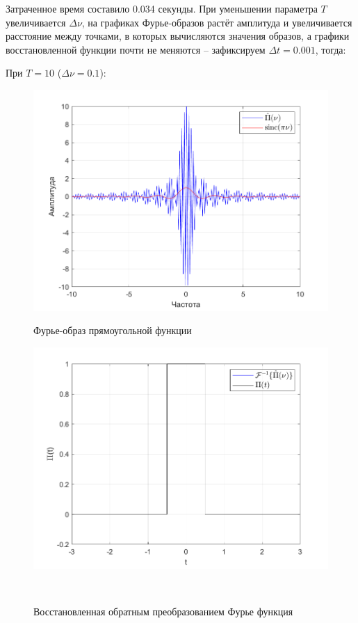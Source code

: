 \documentclass[a4paper]{article}
\begin{document}
Затраченное время составило 0.034 секунды. 
При уменьшении параметра $T$ увеличивается $\Delta \nu$, на графиках Фурье-образов растёт амплитуда и увеличивается расстояние между точками, в которых вычисляются значения образов, а графики восстановленной функции почти не меняются -- зафиксируем $\Delta t = 0.001$, тогда:

При $T = 10$ ($\Delta \nu = 0.1$):

\begin{figure}[H]
    \begin{minipage}{0.5\textwidth}
        \centering \includegraphics[width=\textwidth]{graphs/2/T_10_dt_0.001_V_1000_dv_0.1/fourier_numerical.png}
        \caption{Фурье-образ прямоугольной функции}
    \end{minipage}\hfill
    \begin{minipage}{0.5\textwidth}
        \centering \includegraphics[width=\textwidth]{graphs/2/T_10_dt_0.001_V_1000_dv_0.1/func_inversed_fourier.png}
        \caption{Восстановленная обратным преобразованием Фурье функция}
    \end{minipage}\\[1em]
\end{figure}\noindent\
\end{document}
